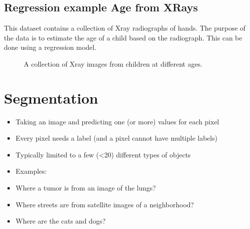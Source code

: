 \documentclass[letterpaper,10pt,english]{sphinxmanual}
\begin{document}
\subsection{Regression example Age from X\sphinxhyphen{}Rays}
\label{\detokenize{03-Datasets:regression-example-age-from-x-rays}}
\sphinxAtStartPar
This dataset contains a collection of X\sphinxhyphen{}ray radiographs of hands. The purpose of the data is to estimate the age of a child based on the radiograph. This can be done using a regression model.

\begin{figure}[htbp]
\centering
\capstart

\noindent{}
\caption{A collection of X\sphinxhyphen{}ray images from children at different ages.}\label{\detokenize{03-Datasets:id12}}\end{figure}



\sphinxAtStartPar
{}


\section{Segmentation}
\label{\detokenize{03-Datasets:segmentation}}\begin{itemize}
\item {} 
\sphinxAtStartPar
Taking an image and predicting one (or more) values for each pixel

\item {} 
\sphinxAtStartPar
Every pixel needs a label (and a pixel cannot have multiple labels)

\item {} 
\sphinxAtStartPar
Typically limited to a few (\textless{}20) different types of objects

\item {} 
\sphinxAtStartPar
Examples:

\item {} 
\sphinxAtStartPar
Where a tumor is from an image of the lungs?

\item {} 
\sphinxAtStartPar
Where streets are from satellite images of a neighborhood?

\item {} 
\sphinxAtStartPar
Where are the cats and dogs?

\end{itemize}
\end{document}

